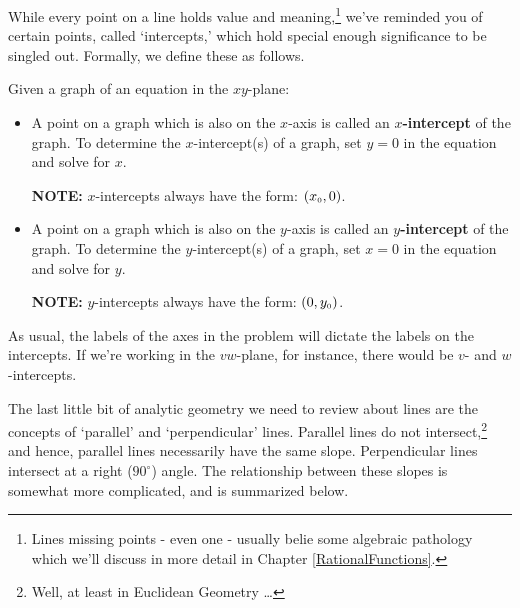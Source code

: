 \documentclass{ximera}
\begin{document}
While every point on a line holds value and meaning,\footnote{Lines missing points  - even one - usually belie some algebraic pathology which we'll discuss in more detail in Chapter \ref{RationalFunctions}.} we've reminded you of certain points, called `intercepts,' which hold special enough significance to be singled out. Formally, we define these as follows.

\medskip

\colorbox{ResultColor}{\bbm


\begin{defn}  Given a graph of an equation in the $xy$-plane:

\label{interceptsdefn}

\begin{itemize}

\item  A point on a graph which is also on the $x$-axis is called an  \textbf{\boldmath $x$-intercept} of the graph.  To determine the $x$-intercept(s) of a graph, set $y = 0$ in the equation and solve for $x$.

\textbf{NOTE:}  $x$-intercepts always have the form:  $(x_{\mbox{\tiny$0$}},0)$.

\item  A point on a graph which is also on the $y$-axis is called an  \textbf{\boldmath $y$-intercept} of the graph. To determine the $y$-intercept(s) of a graph, set $x = 0$ in the equation and solve for $y$.

\textbf{NOTE:}  $y$-intercepts always have the form:  $(0,y_{\mbox{\tiny$0$}})$.

\end{itemize}

\end{defn}

\ebm}

\medskip

As usual, the labels of the axes in the problem will dictate the labels on the intercepts.  If we're working in the $vw$-plane, for instance, there would be $v$- and $w$-intercepts.

\smallskip

The last little bit of analytic geometry we need to review about lines are the concepts of `parallel' and `perpendicular' lines.  Parallel lines do not intersect,\footnote{Well, at least in Euclidean Geometry \dots} and hence, parallel lines necessarily have the same slope.  Perpendicular lines intersect at a right ($90^{\circ}$) angle.   The relationship between these slopes is somewhat more complicated, and is summarized below.
\end{document}
